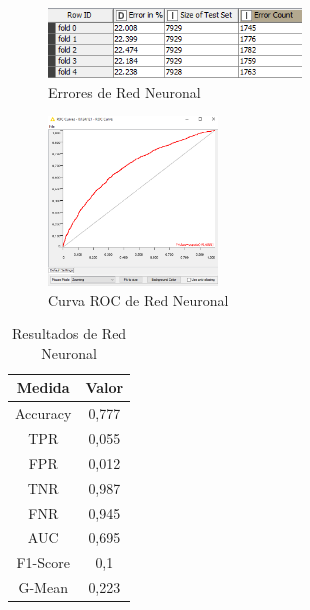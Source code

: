 	\begin{figure}[htb]
		\centering
		\includegraphics[width=0.6\textwidth]{./imagenes/28}
		\caption{Errores de Red Neuronal} \label{fig:2}
	\end{figure}

	\begin{figure}[htb]
		\centering
		\includegraphics[width=0.4\textwidth]{./imagenes/30}
		\caption{Curva ROC de Red Neuronal} \label{fig:1}
	\end{figure}

	\begin{table}[htbp]
		\begin{center}
			\begin{tabular}{|c|c|}
				\hline
				Medida & Valor \\
				\hline \hline
				Accuracy & 0,777 \\
				\hline
				TPR &  0,055 \\
				\hline
				FPR &  0,012 \\
				\hline
				TNR &  0,987 \\
				\hline
				FNR &  0,945 \\
				\hline
				AUC &  0,695 \\
				\hline
				F1-Score & 0,1 \\
				\hline	
				G-Mean & 0,223 \\
				\hline
			\end{tabular}
			\caption{Resultados de Red Neuronal}
			\label{tabla:sencilla}
		\end{center}
	\end{table}
	
